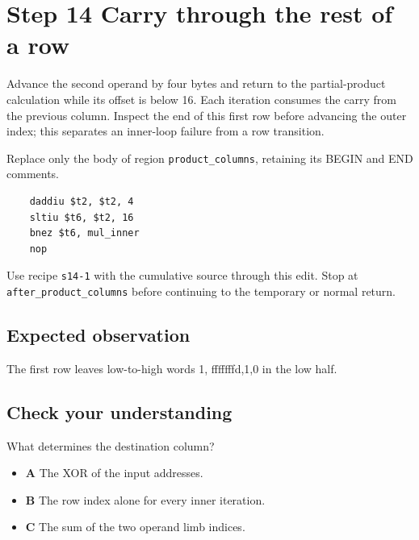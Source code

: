 \section{Step 14 Carry through the rest of a row}\label{rsa-s14}

Advance the second operand by four bytes and return to the partial-product calculation while its offset is below 16. Each iteration consumes the carry from the previous column. Inspect the end of this first row before advancing the outer index; this separates an inner-loop failure from a row transition.

Replace only the body of region \texttt{product\_columns}, retaining its BEGIN and END comments.

\begin{verbatim}
    daddiu $t2, $t2, 4
    sltiu $t6, $t2, 16
    bnez $t6, mul_inner
    nop
\end{verbatim}

Use recipe \texttt{s14-1} with the cumulative source through this edit. Stop at \texttt{after\_product\_columns} before continuing to the temporary or normal return.

\subsection{Expected observation}
The first row leaves low-to-high words 1, fffffffd,1,0 in the low half.

\subsection{Check your understanding}
What determines the destination column?

\begin{itemize}
  \item \textbf{A} The XOR of the input addresses.
  \item \textbf{B} The row index alone for every inner iteration.
  \item \textbf{C} The sum of the two operand limb indices.
\end{itemize}
